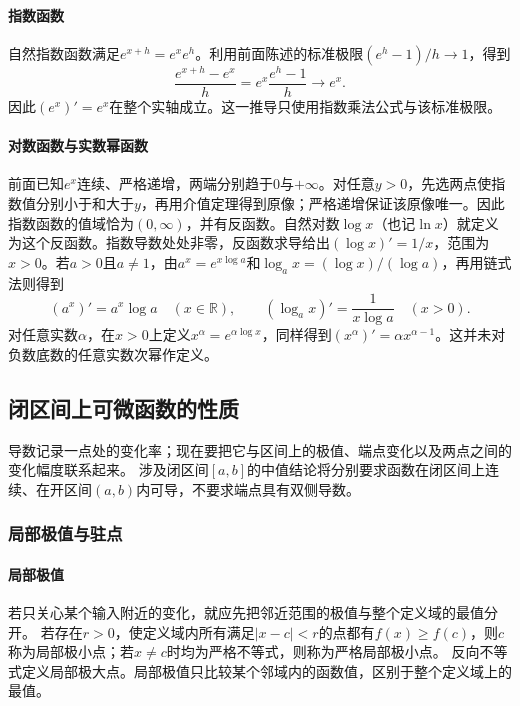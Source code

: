 \paragraph{指数函数}
自然指数函数满足$e^{x+h}=e^xe^h$。利用前面陈述的标准极限$(e^h-1)/h\to1$，得到
\[
 \frac{e^{x+h}-e^x}{h}=e^x\frac{e^h-1}{h}\longrightarrow e^x.
\]
因此$(e^x)'=e^x$在整个实轴成立。这一推导只使用指数乘法公式与该标准极限。

\paragraph{对数函数与实数幂函数}
前面已知$e^x$连续、严格递增，两端分别趋于$0$与$+\infty$。对任意$y>0$，先选两点使指数值分别小于和大于$y$，再用介值定理得到原像；严格递增保证该原像唯一。因此指数函数的值域恰为$(0,\infty)$，并有反函数。自然对数$\log x$（也记$\ln x$）就定义为这个反函数。指数导数处处非零，反函数求导给出$(\log x)'=1/x$，范围为$x>0$。若$a>0$且$a\neq1$，由$a^x=e^{x\log a}$和$\log_a x=(\log x)/(\log a)$，再用链式法则得到
\[
 (a^x)'=a^x\log a\quad(x\in\mathbb R),\qquad
 (\log_a x)'=\frac1{x\log a}\quad(x>0).
\]
对任意实数$\alpha$，在$x>0$上定义$x^\alpha=e^{\alpha\log x}$，同样得到$(x^\alpha)'=\alpha x^{\alpha-1}$。这并未对负数底数的任意实数次幂作定义。

\subsection{闭区间上可微函数的性质}

导数记录一点处的变化率；现在要把它与区间上的极值、端点变化以及两点之间的变化幅度联系起来。
涉及闭区间$[a,b]$的中值结论将分别要求函数在闭区间上连续、在开区间$(a,b)$内可导，不要求端点具有双侧导数。

\subsubsection{局部极值与驻点}

\paragraph{局部极值}
若只关心某个输入附近的变化，就应先把邻近范围的极值与整个定义域的最值分开。
若存在$r>0$，使定义域内所有满足$|x-c|<r$的点都有$f(x)\geq f(c)$，则$c$称为局部极小点；若$x\neq c$时均为严格不等式，则称为严格局部极小点。
反向不等式定义局部极大点。局部极值只比较某个邻域内的函数值，区别于整个定义域上的最值。

